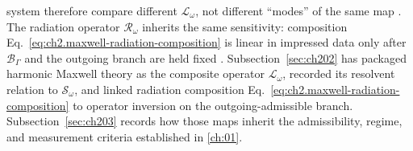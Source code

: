 system therefore compare different \(\mathcal{L}_\omega\), not different
``modes'' of the same map \cite{stratton1941}. The radiation
operator \(\mathcal{R}_\omega\) inherits the same sensitivity: composition
Eq.~\eqref{eq:ch2.maxwell-radiation-composition} is linear in impressed data
only after \(\mathcal{B}_\Gamma\) and the outgoing branch are held fixed
\cite{stratton1941}.
Subsection~\ref{sec:ch202} has packaged harmonic Maxwell theory as the composite operator
\(\mathcal{L}_\omega\), recorded its resolvent relation to \(\mathcal{S}_\omega\), and
linked radiation composition Eq.~\eqref{eq:ch2.maxwell-radiation-composition} to operator
inversion on the outgoing-admissible branch. Subsection~\ref{sec:ch203} records how those
maps inherit the admissibility, regime, and measurement criteria established in
\ref{ch:01}.
